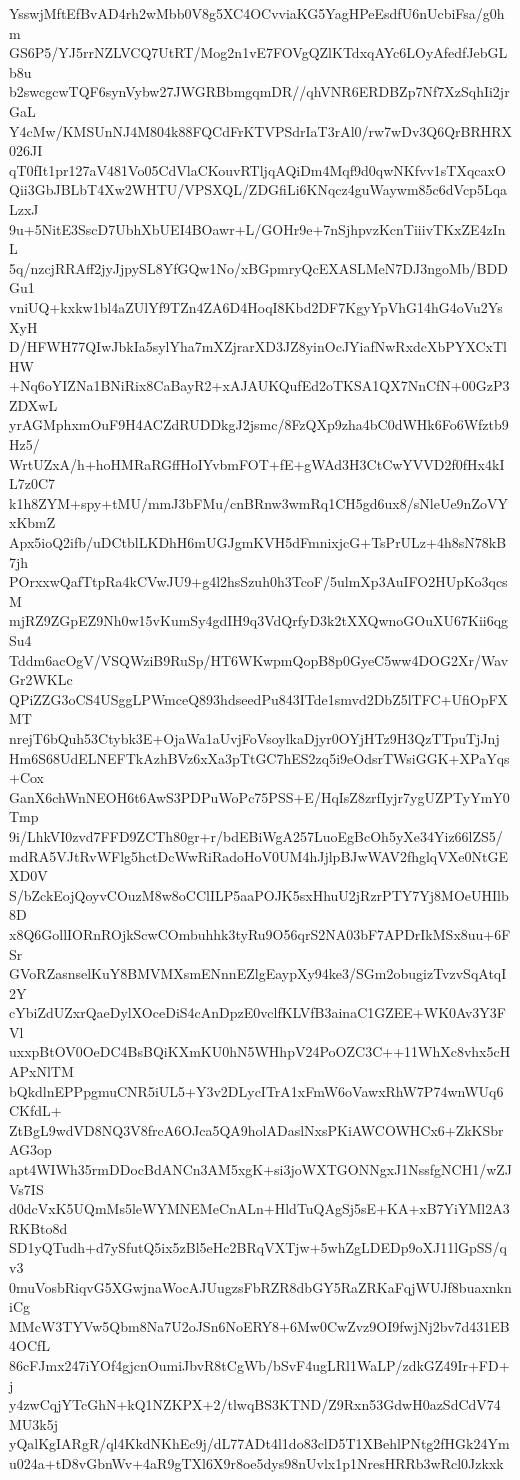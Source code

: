 YsswjMftEfBvAD4rh2wMbb0V8g5XC4OCvviaKG5YagHPeEsdfU6nUcbiFsa/g0hm
GS6P5/YJ5rrNZLVCQ7UtRT/Mog2n1vE7FOVgQZlKTdxqAYc6LOyAfedfJebGLb8u
b2swcgcwTQF6synVybw27JWGRBbmgqmDR//qhVNR6ERDBZp7Nf7XzSqhIi2jrGaL
Y4cMw/KMSUnNJ4M804k88FQCdFrKTVPSdrIaT3rAl0/rw7wDv3Q6QrBRHRX026JI
qT0fIt1pr127aV481Vo05CdVlaCKouvRTljqAQiDm4Mqf9d0qwNKfvv1sTXqcaxO
Qii3GbJBLbT4Xw2WHTU/VPSXQL/ZDGfiLi6KNqcz4guWaywm85c6dVcp5LqaLzxJ
9u+5NitE3SscD7UbhXbUEI4BOawr+L/GOHr9e+7nSjhpvzKcnTiiivTKxZE4zInL
5q/nzcjRRAff2jyJjpySL8YfGQw1No/xBGpmryQcEXASLMeN7DJ3ngoMb/BDDGu1
vniUQ+kxkw1bl4aZUlYf9TZn4ZA6D4HoqI8Kbd2DF7KgyYpVhG14hG4oVu2YsXyH
D/HFWH77QIwJbkIa5sylYha7mXZjrarXD3JZ8yinOcJYiafNwRxdcXbPYXCxTlHW
+Nq6oYIZNa1BNiRix8CaBayR2+xAJAUKQufEd2oTKSA1QX7NnCfN+00GzP3ZDXwL
yrAGMphxmOuF9H4ACZdRUDDkgJ2jsmc/8FzQXp9zha4bC0dWHk6Fo6Wfztb9Hz5/
WrtUZxA/h+hoHMRaRGffHoIYvbmFOT+fE+gWAd3H3CtCwYVVD2f0fHx4kIL7z0C7
k1h8ZYM+spy+tMU/mmJ3bFMu/cnBRnw3wmRq1CH5gd6ux8/sNleUe9nZoVYxKbmZ
Apx5ioQ2ifb/uDCtblLKDhH6mUGJgmKVH5dFmnixjcG+TsPrULz+4h8sN78kB7jh
POrxxwQafTtpRa4kCVwJU9+g4l2hsSzuh0h3TcoF/5ulmXp3AuIFO2HUpKo3qcsM
mjRZ9ZGpEZ9Nh0w15vKumSy4gdIH9q3VdQrfyD3k2tXXQwnoGOuXU67Kii6qgSu4
Tddm6acOgV/VSQWziB9RuSp/HT6WKwpmQopB8p0GyeC5ww4DOG2Xr/WavGr2WKLc
QPiZZG3oCS4USggLPWmceQ893hdseedPu843ITde1smvd2DbZ5lTFC+UfiOpFXMT
nrejT6bQuh53Ctybk3E+OjaWa1aUvjFoVsoylkaDjyr0OYjHTz9H3QzTTpuTjJnj
Hm6S68UdELNEFTkAzhBVz6xXa3pTtGC7hES2zq5i9eOdsrTWsiGGK+XPaYqs+Cox
GanX6chWnNEOH6t6AwS3PDPuWoPc75PSS+E/HqIsZ8zrfIyjr7ygUZPTyYmY0Tmp
9i/LhkVI0zvd7FFD9ZCTh80gr+r/bdEBiWgA257LuoEgBcOh5yXe34Yiz66lZS5/
mdRA5VJtRvWFlg5hctDcWwRiRadoHoV0UM4hJjlpBJwWAV2fhglqVXe0NtGEXD0V
S/bZckEojQoyvCOuzM8w8oCClILP5aaPOJK5sxHhuU2jRzrPTY7Yj8MOeUHIlb8D
x8Q6GollIORnROjkScwCOmbuhhk3tyRu9O56qrS2NA03bF7APDrIkMSx8uu+6FSr
GVoRZasnselKuY8BMVMXsmENnnEZlgEaypXy94ke3/SGm2obugizTvzvSqAtqI2Y
cYbiZdUZxrQaeDylXOceDiS4cAnDpzE0vclfKLVfB3ainaC1GZEE+WK0Av3Y3FVl
uxxpBtOV0OeDC4BsBQiKXmKU0hN5WHhpV24PoOZC3C++11WhXc8vhx5cHAPxNlTM
bQkdlnEPPpgmuCNR5iUL5+Y3v2DLycITrA1xFmW6oVawxRhW7P74wnWUq6CKfdL+
ZtBgL9wdVD8NQ3V8frcA6OJca5QA9holADaslNxsPKiAWCOWHCx6+ZkKSbrAG3op
apt4WIWh35rmDDocBdANCn3AM5xgK+si3joWXTGONNgxJ1NssfgNCH1/wZJVs7IS
d0dcVxK5UQmMs5leWYMNEMeCnALn+HldTuQAgSj5sE+KA+xB7YiYMl2A3RKBto8d
SD1yQTudh+d7ySfutQ5ix5zBl5eHc2BRqVXTjw+5whZgLDEDp9oXJ11lGpSS/qv3
0muVosbRiqvG5XGwjnaWocAJUugzsFbRZR8dbGY5RaZRKaFqjWUJf8buaxnkniCg
MMcW3TYVw5Qbm8Na7U2oJSn6NoERY8+6Mw0CwZvz9OI9fwjNj2bv7d431EB4OCfL
86cFJmx247iYOf4gjcnOumiJbvR8tCgWb/bSvF4ugLRl1WaLP/zdkGZ49Ir+FD+j
y4zwCqjYTcGhN+kQ1NZKPX+2/tlwqBS3KTND/Z9Rxn53GdwH0azSdCdV74MU3k5j
yQalKgIARgR/ql4KkdNKhEc9j/dL77ADt4l1do83clD5T1XBehlPNtg2fHGk24Ym
u024a+tD8vGbnWv+4aR9gTXl6X9r8oe5dys98nUvlx1p1NresHRRb3wRcl0Jzkxk
